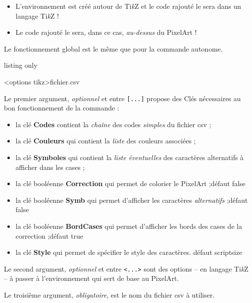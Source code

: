 \documentclass{article}
\newcommand\Cle[1]{{\bfseries\sffamily\textlangle #1\textrangle}}
\begin{document}
\begin{itemize}
	\item L'environnement est créé autour de Ti\textit{k}Z et le code rajouté le sera dans un langage Ti\textit{k}Z !
	\item Le code rajouté le sera, dans ce cas, \textit{au-dessus} du PixelArt !
\end{itemize}

Le fonctionnement global est le même que pour la commande autonome.

\begin{PresentationCode}{listing only}
	\begin{EnvPixelArtTikz}[clés]<options tikz>{fichier.csv}
	\end{EnvPixelArtTikz}
\end{PresentationCode}

Le premier argument, \textit{optionnel} et entre \texttt{[...]} propose des \textsf{Clés} nécessaires au bon fonctionnement de la commande :

\begin{itemize}
	\item la clé \Cle{Codes} contient la \textit{chaîne} des codes \textit{simples} du  fichier \textsf{csv} ;
	\item la clé \Cle{Couleurs} qui contient la \textit{liste} des couleurs associées ;
	\item la clé \Cle{Symboles} qui contient la \textit{liste éventuelles} des caractères alternatifs à afficher dans les cases ;
	\item la clé booléenne \Cle{Correction} qui permet de colorier le PixelArt ;\hfill{}défaut \textsf{false}
	\item la clé booléenne \Cle{Symb} qui permet d'afficher les caractères \textit{alternatifs} ;\hfill{}défaut \textsf{false}
	\item la clé booléenne \Cle{BordCases} qui permet d'afficher les bords des cases de la correction ;\hfill{}défaut \textsf{true}
	\item la clé \Cle{Style} qui permet de spécifier le style des caractères. \hfill{}défaut \textsf{scriptsize}
\end{itemize}

Le second argument, \textit{optionnel} et entre \texttt{<...>} sont des options -- en langage Ti\textit{k}Z -- à passer à l'environnement qui sert de base au PixelArt.

\medskip

Le troisième argument, \textit{obligatoire}, est le nom du fichier \textsf{csv} à utiliser.
\end{document}
